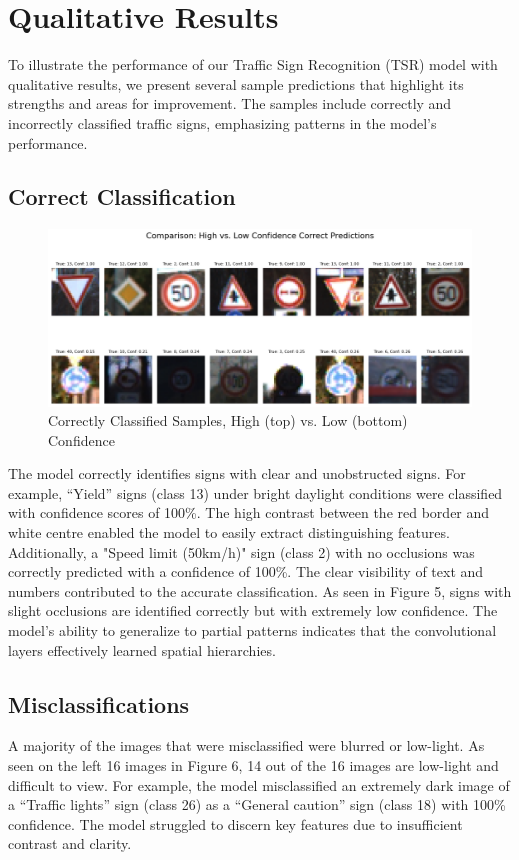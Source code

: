\documentclass{article} %
\begin{document}
\section{Qualitative Results}
To illustrate the performance of our Traffic Sign Recognition (TSR) model with qualitative results, we present several sample predictions that highlight its strengths and areas for improvement. The samples include correctly and incorrectly classified traffic signs, emphasizing patterns in the model's performance.
\subsection{Correct Classification} 

\begin{figure}[h]
    \centering
    \includegraphics[width=0.5\linewidth]{Comparison of confidence.png}
    \caption{Correctly Classified Samples, High (top) vs. Low (bottom) Confidence}
    \label{fig:enter-label}
\end{figure}

    The model correctly identifies signs with clear and unobstructed signs. For example, “Yield” signs (class 13) under bright daylight conditions were classified with confidence scores of 100\%. The high contrast between the red border and white centre enabled the model to easily extract distinguishing features. Additionally, a "Speed limit (50km/h)" sign (class 2) with no occlusions was correctly predicted with a confidence of 100\%. The clear visibility of text and numbers contributed to the accurate classification.
    As seen in Figure 5, signs with slight occlusions are identified correctly but with extremely low confidence. The model’s ability to generalize to partial patterns indicates that the convolutional layers effectively learned spatial hierarchies.

\subsection{Misclassifications}
    A majority of the images that were misclassified were blurred or low-light. As seen on the left 16 images in Figure 6, 14 out of the 16 images are low-light and difficult to view. For example, the model misclassified an extremely dark image of a “Traffic lights” sign (class 26) as a “General caution” sign (class 18) with 100\% confidence. The model struggled to discern key features due to insufficient contrast and clarity.
    
\end{document}
